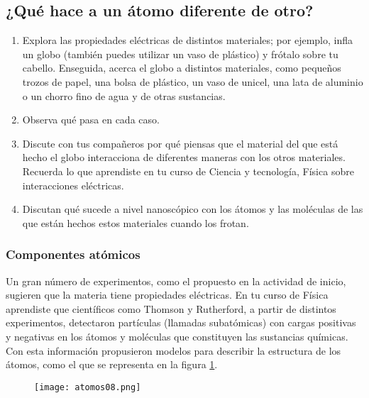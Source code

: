 \newpage
\subsection{¿Qué hace a un átomo diferente de otro?}

\begin{boxK}
    \begin{enumerate}
        \item Explora las propiedades eléctricas de distintos materiales; por ejemplo, infla un globo
              (también puedes utilizar un vaso de plástico) y frótalo sobre tu cabello. Enseguida,
              acerca el globo a distintos materiales, como pequeños trozos de papel,
              una bolsa de plástico, un vaso de unicel, una lata de aluminio o un
              chorro fino de agua y de otras sustancias.
        \item Observa qué pasa en cada caso.
        \item Discute con tus compañeros por qué piensas que el material del que
              está hecho el globo interacciona de diferentes maneras con los otros
              materiales. Recuerda lo que aprendiste en tu curso de Ciencia y tecnología,
              Física sobre interacciones eléctricas.
        \item Discutan qué sucede a nivel nanoscópico con los átomos y las moléculas
              de las que están hechos estos materiales cuando los frotan.
    \end{enumerate}

\end{boxK}

\subsubsection{Componentes atómicos}

Un gran número de experimentos, como el propuesto en la actividad de inicio, sugieren
que la materia tiene propiedades eléctricas. En tu curso de Física aprendiste que
científicos como Thomson y Rutherford, a partir de distintos experimentos, detectaron
partículas (llamadas subatómicas) con cargas positivas y negativas en los átomos
y moléculas que constituyen las sustancias químicas. Con esta información propusieron
modelos para describir la estructura de los átomos, como el que se representa en
la figura \ref{fig:atomos08}.\\

\begin{figure}[H]
    \centering
    \texttt{[image: atomos08.png]}
    \label{fig:atomos08}
\end{figure}%

